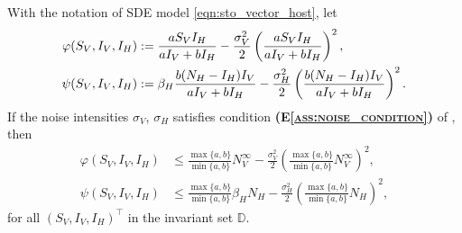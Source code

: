 %
%
%
%
\begin{proposition}\label{prp:quadratic_bound}
    With the notation of SDE model \eqref{eqn:sto_vector_host},
    let
    \begin{equation}
        \begin{aligned}
            \varphi (S_V, I_V, I_H) &:= 
                 \frac{a S_V I_H}{a I_V + b I_H}
                - 
                \frac{\sigma_V ^ 2}{2} 
                \left(
                    \frac{ a S_V I_H}{a I_V + b I_H}
                \right) ^2,
            \\
            \psi (S_V, I_V, I_H) &:=
            \beta_H 
            \frac{
                b (N_H - I_H)  I_V
            }{%
                a I_V + b I_H
            }
            - 
            \frac{\sigma_H ^ 2}{2} 
                \left(
                    \frac{
                        b (N_H - I_H)  I_V
                    }{
                        a I_V + b I_H
                    }
                \right) ^ 2.
        \end{aligned}
    \end{equation}
    If the noise intensities $\sigma_V$, $\sigma_H$ satisfies condition 
    \textsc{
        \textbf{(E\textendash\ref{ass:noise_condition})}
    }
    of , then
    \begin{equation}
        \label{eqn:max_min_bounds}
        \begin{aligned}
            \varphi (S_V, I_V, I_H) 
            & \leq 
                \frac{
                    \max\{a,b\}
                }{
                    \min \{a, b\}
                }
                  N_V ^ {\infty}
                - 
                \frac{\sigma_V ^ 2}{2}
                \left(
                    \frac{
                        \max\{a,b\}
                    }{
                        \min \{a, b\}
                    } N_V ^ {\infty}
                \right) ^ 2,
            \\
            \psi (S_V, I_V, I_H) 
            & \leq
                \frac{
                    \max\{a,b\}
                }{
                    \min \{a, b\}
                }
                \beta_H  N_H - \frac{\sigma_H ^ 2}{2}
                    \left(
                        \frac{
                            \max\{a,b\}
                        }{
                            \min \{a, b\}
                        }
                        N_H
                  \right) ^ 2,
        \end{aligned}
    \end{equation}
    for all $(S_V, I_V, I_H)^{\top}$ in the invariant set $\mathbb{D}$.
\end{proposition}

